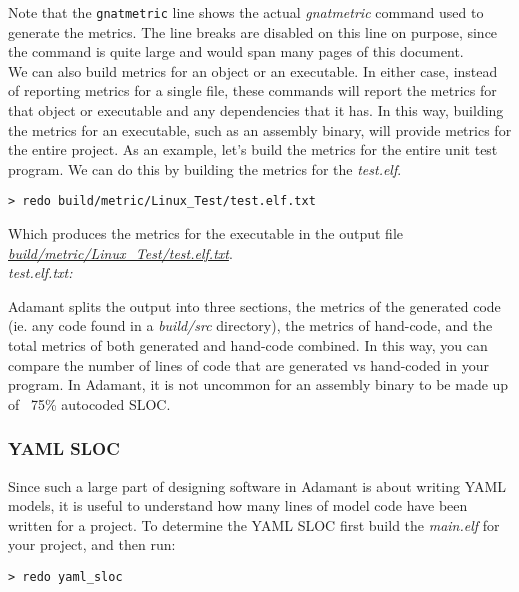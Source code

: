 Note that the \texttt{gnatmetric} line shows the actual \textit{gnatmetric} command used to generate the metrics. The line breaks are disabled on this line on purpose, since the command is quite large and would span many pages of this document. \\

We can also build metrics for an object or an executable. In either case, instead of reporting metrics for a single file, these commands will report the metrics for that object or executable and any dependencies that it has. In this way, building the metrics for an executable, such as an assembly binary, will provide metrics for the entire project. As an example, let's build the metrics for the entire unit test program. We can do this by building the metrics for the \textit{test.elf}.

\vspace{5mm} %
\begin{verbatim}
> redo build/metric/Linux_Test/test.elf.txt
\end{verbatim}
\vspace{5mm} %

Which produces the metrics for the executable in the output file \textit{\url{build/metric/Linux\_Test/test.elf.txt}}. \\

\textit{test.elf.txt:}

Adamant splits the output into three sections, the metrics of the generated code (ie. any code found in a \textit{build/src} directory), the metrics of hand-code, and the total metrics of both generated and hand-code combined. In this way, you can compare the number of lines of code that are generated vs hand-coded in your program. In Adamant, it is not uncommon for an assembly binary to be made up of ~75\% autocoded SLOC.

\subsubsection{YAML SLOC}

Since such a large part of designing software in Adamant is about writing YAML models, it is useful to understand how many lines of model code have been written for a project. To determine the YAML SLOC first build the \textit{main.elf} for your project, and then run:

\vspace{5mm} %
\begin{verbatim}
> redo yaml_sloc
\end{verbatim}
\vspace{5mm} %

